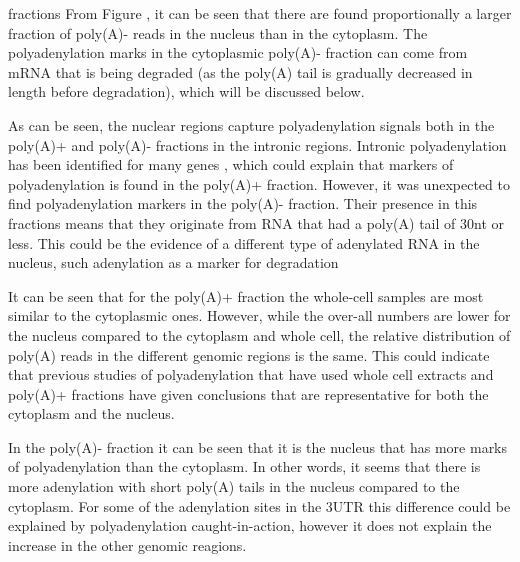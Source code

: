 \documentclass[a4paper]{article}
\begin{document}
fractions From Figure , it can be seen that there are found
proportionally a larger fraction of poly(A)- reads in the nucleus than in the
cytoplasm. The polyadenylation marks in the cytoplasmic poly(A)- fraction can
come from mRNA that is being degraded (as the poly(A) tail is gradually
decreased in length before degradation), which will be discussed below.



As can be seen, the nuclear regions capture polyadenylation signals both in the
poly(A)+ and poly(A)- fractions in the intronic regions. Intronic
polyadenylation has been identified for many genes \cite{tian_widespread_2007},
which could explain that markers of polyadenylation is found in the poly(A)+
fraction.  However, it was unexpected to find polyadenylation markers in the
poly(A)- fraction. Their presence in this fractions means that they originate
from RNA that had a poly(A) tail of 30nt or less. This could be the
evidence of a different type of adenylated RNA in the nucleus, such adenylation
as a marker for degradation \cite{slomovic_addition_2010}

It can be seen that for the poly(A)+ fraction the whole-cell samples are most
similar to the cytoplasmic ones. However, while the over-all numbers are lower for
the nucleus compared to the cytoplasm and whole cell, the relative distribution of
poly(A) reads in the different genomic regions is the same. This could indicate that
previous studies of polyadenylation that have used whole cell extracts and
poly(A)+ fractions have given conclusions that are representative for both the
cytoplasm and the nucleus.

In the poly(A)- fraction it can be seen that it is the nucleus that has more
marks of polyadenylation than the cytoplasm. In other words, it seems that
there is more adenylation with short poly(A) tails in the nucleus compared to
the cytoplasm. For some of the adenylation sites in the 3UTR this difference
could be explained by polyadenylation caught-in-action, however it does not
explain the increase in the other genomic reagions.
\end{document}
